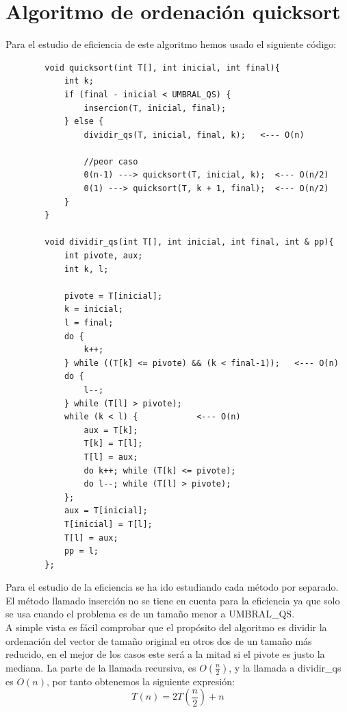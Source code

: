 \documentclass[11pt,openany]{book}
\begin{document}
        \section*{Algoritmo de ordenación quicksort}
        Para el estudio de eficiencia de este algoritmo hemos usado el siguiente código:
        \begin{lstlisting}
        void quicksort(int T[], int inicial, int final){
            int k;
            if (final - inicial < UMBRAL_QS) {
                insercion(T, inicial, final);
            } else {
                dividir_qs(T, inicial, final, k);   <--- O(n)

                //peor caso    
                0(n-1) ---> quicksort(T, inicial, k);  <--- O(n/2)
                0(1) ---> quicksort(T, k + 1, final);  <--- O(n/2)
            }
        }

        void dividir_qs(int T[], int inicial, int final, int & pp){
            int pivote, aux;
            int k, l;

            pivote = T[inicial];
            k = inicial;
            l = final;
            do {
                k++;
            } while ((T[k] <= pivote) && (k < final-1));   <--- O(n)
            do {
                l--;
            } while (T[l] > pivote);
            while (k < l) {            <--- O(n)
                aux = T[k];
                T[k] = T[l];
                T[l] = aux;
                do k++; while (T[k] <= pivote);
                do l--; while (T[l] > pivote);
            };
            aux = T[inicial];
            T[inicial] = T[l];
            T[l] = aux;
            pp = l;
        };
        \end{lstlisting}
        Para el estudio de la eficiencia se ha ido estudiando cada método por separado. El método llamado inserción 
        no se tiene en cuenta para la eficiencia ya que solo se usa cuando el problema es de un tamaño menor a UMBRAL\_QS.\\
        A simple vista es fácil comprobar que el propósito del algoritmo es dividir la ordenación del vector de tamaño
        original en otros dos de un tamaño más reducido, en el mejor de los casos este será a la mitad si el pivote es 
        justo la mediana. La parte de la llamada recursiva, es $O(\frac{n}{2})$, y la llamada a dividir\_qs es $O(n)$, por tanto obtenemos
        la siguiente expresión:
        \begin{equation*}
            T(n) = 2 T\left(\frac{n}{2}\right) + n
        \end{equation*}
\end{document}
